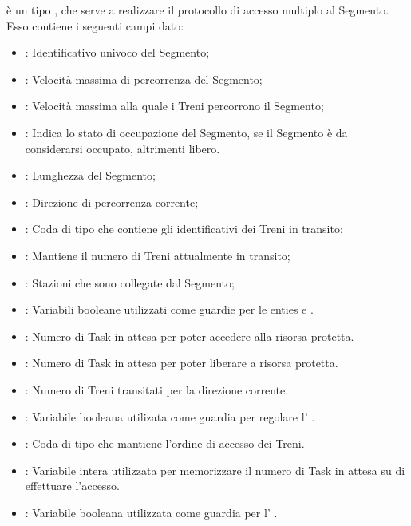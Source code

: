 	 è un tipo , che serve a realizzare il protocollo di accesso multiplo al Segmento. Esso contiene i seguenti campi dato:
	\begin{itemize}
		
		\item {}: Identificativo univoco del Segmento;
		\item {}: Velocità massima di percorrenza del Segmento;
		\item {}: Velocità massima alla quale i Treni percorrono il Segmento;
		\item {}: Indica lo stato di occupazione del Segmento, se  il Segmento è da considerarsi occupato, altrimenti libero.
		\item {}: Lunghezza del Segmento;
		
		\item {}: Direzione di percorrenza corrente;
		
		\item {}: Coda di tipo  che contiene gli identificativi dei Treni in transito;
		\item {}: Mantiene il numero di Treni attualmente in transito;
		
		
		\item {}: Stazioni che sono collegate dal Segmento; 
		
		\item {}: Variabili booleane utilizzati come guardie per le enties  e .
		
		\item {}: Numero di Task in attesa per poter accedere alla risorsa protetta.
		
		\item {}:  Numero di Task in attesa per poter liberare a risorsa protetta. 
		
		\item {}: Numero di Treni transitati per la direzione corrente.
		
		
		\item {}: Variabile booleana utilizata come guardia per regolare l' .

		
		\item {}: Coda di tipo  che mantiene l'ordine di accesso dei Treni.

		\item {}: Variabile intera utilizzata per memorizzare il numero di Task in attesa su di effettuare l'accesso.

		\item {}: Variabile booleana utilizzata come guardia per l' .
		
	\end{itemize}
	
